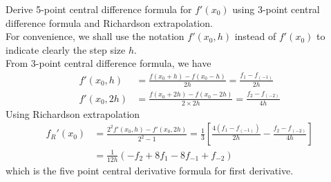 \documentclass[12pt,class=book,crop=false]{standalone}
\begin{document}
\begin{ex}
    Derive 5-point central difference formula for $ f' (x_0)  $ using 3-point central difference formula and Richardson extrapolation.\\


    For convenience, we shall use the notation $ f' (x_0,h) $ instead of $ f' (x_0) $ to indicate clearly the step size $ h $.\\
    From 3-point central difference formula, we have
    \begin{align*}
        f' (x_0,h)  & =\frac{f(x_0+h)-f(x_0-h)}{2h}=\frac{f_1-f_(-1)}{2h}           \\
        f' (x_0,2h) & =\frac{f(x_0+2h)-f(x_0-2h)}{2\times 2h}=\frac{f_2-f_(-2)}{4h}
    \end{align*}
    Using Richardson extrapolation
    \begin{align*}
        f_R' (x_0) & =\frac{2^2 f'(x_0,h)-f'(x_0,2h)}{2^2-1}=\frac{1}{3} \left[ \frac{4(f_1-f_(-1))}{2h}-\frac{f_2-f_(-2)}{4h} \right] \\
                   & =\frac{1}{12h} (-f_2+8f_1-8f_{-1}+f_{-2})
    \end{align*}
    which is the five point central derivative formula for first derivative.
\end{ex}
\newpage
\end{document}
